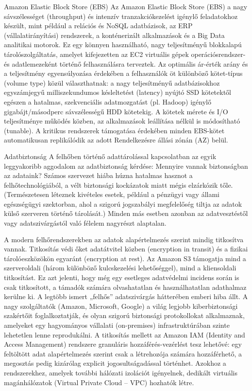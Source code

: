 \documentclass[
]{article}
\begin{document}
Amazon Elastic Block Store (EBS) Az Amazon Elastic Block Store (EBS) a
nagy sávszélességet (throughput) és intenzív tranzakciókezelést igénylő
feladatokhoz készült, mint például a relációs és NoSQL adatbázisok, az
ERP (vállalatirányítási) rendszerek, a konténerizált alkalmazások és a
Big Data analitikai motorok. Ez egy könnyen használható, nagy
teljesítményű blokkalapú tárolószolgáltatás, amelyet kifejezetten az EC2
virtuális gépek operációsrendszer- és adatlemezeként történő
felhasználásra terveztek. Az optimális ár-érték arány és a teljesítmény
egyensúlyozása érdekében a felhasználók öt különböző kötet-típus (volume
type) közül választhatnak: a nagy teljesítményű adatbázisokhoz
egyszámjegyű milliszekundumos késleltetést (latency) nyújtó SSD
kötetektől egészen a hatalmas, szekvenciális adatmozgatást (pl. Hadoop)
igénylő gigabájt/másodperc sávszélességű HDD kötetekig. A kötetek mérete
és I/O teljesítménye működés közben, az alkalmazások leállítása nélkül
is módosítható (tunable). A kritikus rendszerek támogatása érdekében
minden EBS-kötet automatikusan replikálódik az adott Rendelkezésre
állási zónán (AZ) belül.

Adatbiztonság A felhőben történő adattárolással kapcsolatban az egyik
leggyakoribb aggodalom az adatbiztonság kérdése: Mennyire vannak
biztonságban az adataink? Számos szervezet hiába húzna hatalmas hasznot
a felhőtechnológiából, a vélt biztonsági kockázatok miatt mégis
elzárkózik tőle. (Természetesen léteznek kivételes esetek, például a
pénzügyi vagy állami egészségügyi szektorban, ahol a szigorú jogszabályi
megfelelőség tiltja az adatok külső szerveren történő tárolását.) Minden
más esetben azonban az adatvesztéstől vagy adatszivárgástól való félelem
nagyrészt alaptalan.

A modern felhőrendszerekben az adatok alapértelmezés szerint mindig
titkosítva vannak. Titkosítás védi őket adatátvitel közben (encryption
in transit) és a fizikai tárolóeszközökön egyaránt (encryption at rest).
Az Amazon S3 támogatja mind a szerveroldali (három különböző
kulcskezelési lehetőséggel), mind a kliensoldali titkosítást. Ez azt
jelenti, hogy még egy esetleges adatvédelmi incidens során is csak
titkosított, a támadók számára olvashatatlan és használhatatlan
adathalmaz kerülne ki. A legtöbb ismert „felhős'' adatszivárgás
hátterében emberi hiba állt. A nagy szolgáltatók (Amazon, Microsoft,
Google) a világ legjobb kiberbiztonsági szakértőit foglalkoztatják, és
olyan szigorú biztonsági protokollokat alkalmaznak, amelyeket egy
hagyományos vállalati (on-premises) infrastruktúrában szinte lehetetlen
lenne reprodukálni. A titkosítás mellett az Amazon IAM (Identity and
Access Management) rendszere granuláris hozzáférés-vezérlést tesz
lehetővé: egy feltöltött adat alapértelmezés szerint csak a létrehozója
számára hozzáférhető, a megosztás pedig kizárólag explicit
jogosultságadással történhet. Azokhoz a rendszerekhez, amelyek további
hálózati izolációt igényelnek, dedikált virtuális magánhálózatok
(Virtual Private Cloud -- VPC) hozhatók létre.
\end{document}
